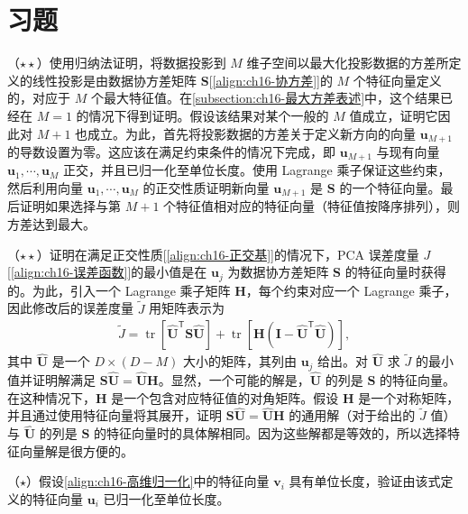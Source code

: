 \documentclass[../../main.tex]{subfiles}
\begin{document}
\section{习题}\label{section:ch16-习题}

\begin{exercise}\label{exercise:ch16-01}
（$\star\star$）使用归纳法证明，将数据投影到 $M$ 维子空间以最大化投影数据的方差所定义的线性投影是由数据协方差矩阵 $\bm{S}$[\eqref{align:ch16-协方差}]的 $M$ 个特征向量定义的，对应于 $M$ 个最大特征值。在\cref{subsection:ch16-最大方差表述}中，这个结果已经在 $M=1$ 的情况下得到证明。假设该结果对某个一般的 $M$ 值成立，证明它因此对 $M+1$ 也成立。为此，首先将投影数据的方差关于定义新方向的向量 $\bm{u}_{M+1}$ 的导数设置为零。这应该在满足约束条件的情况下完成，即 $\bm{u}_{M+1}$ 与现有向量 $\bm{u}_1,\cdots,\bm{u}_M$ 正交，并且已归一化至单位长度。使用 Lagrange 乘子保证这些约束，然后利用向量 $\bm{u}_1,\cdots,\bm{u}_M$ 的正交性质证明新向量 $\bm{u}_{M+1}$ 是 $\bm{S}$ 的一个特征向量。最后证明如果选择与第 $M+1$ 个特征值相对应的特征向量（特征值按降序排列），则方差达到最大。
\end{exercise}

\begin{exercise}\label{exercise:ch16-02}
（$\star\star$）证明在满足正交性质[\eqref{align:ch16-正交基}]的情况下，PCA 误差度量 $J$[\eqref{align:ch16-误差函数}]的最小值是在 $\bm{u}_j$ 为数据协方差矩阵 $\bm{S}$ 的特征向量时获得的。为此，引入一个 Lagrange 乘子矩阵 $\bm{H}$，每个约束对应一个 Lagrange 乘子，因此修改后的误差度量 $\tilde{J}$ 用矩阵表示为
\begin{align}
  \tilde{J}=\operatorname{tr}\left[\widehat{\bm{U}}^{\mathsf T}\bm{S}\widehat{\bm{U}}\right]+\operatorname{tr}\left[\bm{H}\left(\bm{I}-\widehat{\bm{U}}^{\mathsf T}\widehat{\bm{U}}\right)\right],
  \label{align:ch16-习题16.2Lagrange}
\end{align}
其中 $\widehat{\bm{U}}$ 是一个 $D\times(D-M)$ 大小的矩阵，其列由 $\bm{u}_j$ 给出。对 $\widehat{\bm{U}}$ 求 $\tilde{J}$ 的最小值并证明解满足 $\bm{S}\widehat{\bm{U}}=\widehat{\bm{U}}\bm{H}$。显然，一个可能的解是，$\widehat{\bm{U}}$ 的列是 $\bm{S}$ 的特征向量。在这种情况下，$\bm{H}$ 是一个包含对应特征值的对角矩阵。假设 $\bm{H}$ 是一个对称矩阵，并且通过使用特征向量将其展开，证明 $\bm{S}\widehat{\bm{U}}=\widehat{\bm{U}}\bm{H}$ 的通用解（对于给出的 $\tilde{J}$ 值）与 $\widehat{\bm{U}}$ 的列是 $\bm{S}$ 的特征向量时的具体解相同。因为这些解都是等效的，所以选择特征向量解是很方便的。
\end{exercise}

\begin{exercise}\label{exercise:ch16-03}
（$\star$）假设\eqref{align:ch16-高维归一化}中的特征向量 $\bm{v}_i$ 具有单位长度，验证由该式定义的特征向量 $\bm{u}_i$ 已归一化至单位长度。
\end{exercise}
\end{document}
